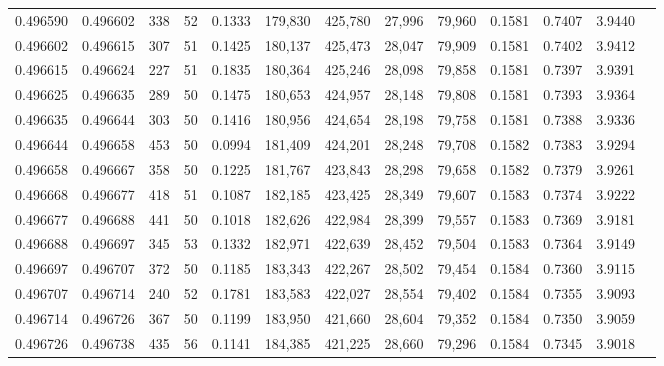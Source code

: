 \begin{tabular}{rrrrrrrrrrrrr}
0.496590 & 0.496602 & 338 &  52 &                                     0.1333 & 179,830 & 425,780 &  27,996 &  79,960 & 0.1581 & 0.7407 & 3.9440 \\
0.496602 & 0.496615 & 307 &  51 &                                     0.1425 & 180,137 & 425,473 &  28,047 &  79,909 & 0.1581 & 0.7402 & 3.9412 \\
0.496615 & 0.496624 & 227 &  51 &                                     0.1835 & 180,364 & 425,246 &  28,098 &  79,858 & 0.1581 & 0.7397 & 3.9391 \\
0.496625 & 0.496635 & 289 &  50 &                                     0.1475 & 180,653 & 424,957 &  28,148 &  79,808 & 0.1581 & 0.7393 & 3.9364 \\
0.496635 & 0.496644 & 303 &  50 &                                     0.1416 & 180,956 & 424,654 &  28,198 &  79,758 & 0.1581 & 0.7388 & 3.9336 \\
0.496644 & 0.496658 & 453 &  50 &                                     0.0994 & 181,409 & 424,201 &  28,248 &  79,708 & 0.1582 & 0.7383 & 3.9294 \\
0.496658 & 0.496667 & 358 &  50 &                                     0.1225 & 181,767 & 423,843 &  28,298 &  79,658 & 0.1582 & 0.7379 & 3.9261 \\
0.496668 & 0.496677 & 418 &  51 &                                     0.1087 & 182,185 & 423,425 &  28,349 &  79,607 & 0.1583 & 0.7374 & 3.9222 \\
0.496677 & 0.496688 & 441 &  50 &                                     0.1018 & 182,626 & 422,984 &  28,399 &  79,557 & 0.1583 & 0.7369 & 3.9181 \\
0.496688 & 0.496697 & 345 &  53 &                                     0.1332 & 182,971 & 422,639 &  28,452 &  79,504 & 0.1583 & 0.7364 & 3.9149 \\
0.496697 & 0.496707 & 372 &  50 &                                     0.1185 & 183,343 & 422,267 &  28,502 &  79,454 & 0.1584 & 0.7360 & 3.9115 \\
0.496707 & 0.496714 & 240 &  52 &                                     0.1781 & 183,583 & 422,027 &  28,554 &  79,402 & 0.1584 & 0.7355 & 3.9093 \\
0.496714 & 0.496726 & 367 &  50 &                                     0.1199 & 183,950 & 421,660 &  28,604 &  79,352 & 0.1584 & 0.7350 & 3.9059 \\
0.496726 & 0.496738 & 435 &  56 &                                     0.1141 & 184,385 & 421,225 &  28,660 &  79,296 & 0.1584 & 0.7345 & 3.9018 \\

\end{tabular}
